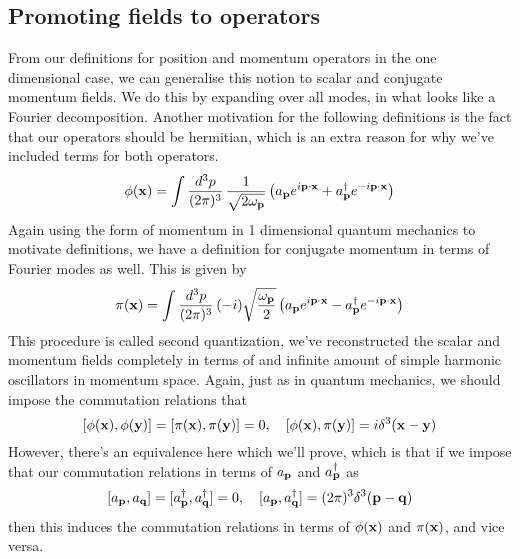 \subsection{Promoting fields to operators} 
From our definitions for position and momentum operators in the one dimensional case, we can generalise this notion to scalar and conjugate momentum fields. We do this by expanding over all modes, in what looks like a Fourier decomposition. Another motivation for the following definitions is the fact that our operators should be hermitian, which is an extra reason for why we've included terms for both operators.
\[ 
\phi ( \mathbf{ x })  = \int \frac{ d^3 p }{ (2 \pi)^3 } \, \frac{ 1 }{  \sqrt{ 2 \omega_\mathbf{  p}}  } \left( a_{ \mathbf{ p }} e^{ i \mathbf{ p } \cdot \mathbf{x} }  + a^\dagger_{ \mathbf{  p }} e^{ - i \mathbf{ p } \cdot \mathbf{x} } \right) 
\] 
Again using the form of momentum in 1 dimensional quantum mechanics to motivate definitions, we have a definition for conjugate momentum in terms of Fourier modes as well. This is given by 
\[ 
\pi (\mathbf{ x }) = \int \frac{ d^3 p }{ (2 \pi)^3 } \, ( -i )  \sqrt{ \frac{ \omega_\mathbf{ p} }{ 2 } } \left( a_{ \mathbf{ p }} e^{ i \mathbf{ p } \cdot \mathbf{x} } - a^\dagger_{ \mathbf{ p }} e^{ - i \mathbf{ p } \cdot \mathbf{x} } \right) 
\] This procedure is called second quantization, we've reconstructed the scalar and momentum fields completely in terms of and infinite amount of simple harmonic oscillators in momentum space. Again, just as in quantum mechanics, we should impose the commutation relations that 
\[ 
[ \phi ( \mathbf{  x }), \phi ( \mathbf{ y }) ] = [ \pi (\mathbf{ x }),  \pi (\mathbf{ y })  ]  = 0, \quad [ \phi ( \mathbf{  x }), \pi (\mathbf{ y }) ] =i  \delta^3 ( \mathbf{ x - y  } ) 
\]
However, there's an equivalence here which we'll prove, which is that if we impose that our commutation relations in terms of $a_{ \mathbf{ p }}$ and $a^\dagger_{ \mathbf{ p }}$ as 
\[ 
[ a_{ \mathbf{  p }}, a_{ \mathbf{ q  }} ] = [ a^\dagger_{ \mathbf{ p }}, a^\dagger_{ \mathbf{ q }} ] = 0, \quad [ a_{ \mathbf{ p }}, a^\dagger_{ \mathbf{ q }} ] = ( 2 \pi)^3 \delta^3 ( \mathbf{p - q} ) 
\] then this induces the commutation relations in terms of $\phi ( \mathbf{ x })$ and $\pi (\mathbf{ x })$, and vice versa. 

